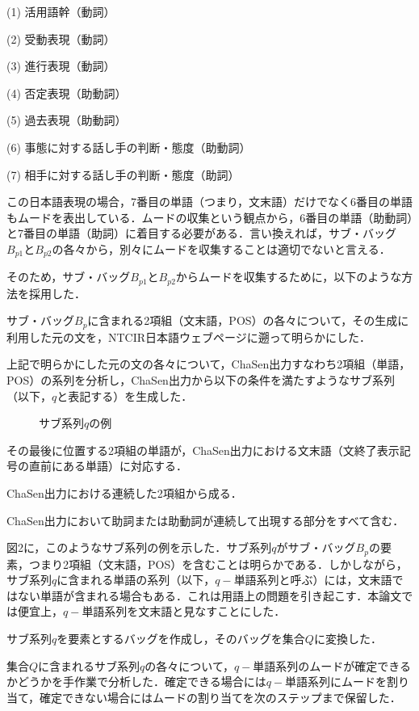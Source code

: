 \documentclass[japanese]{jnlp_1.4}
\newcommand{\InHone}[1]{}
\newcommand{\InHtwo}[1]{}
\begin{document}
(1) 活用語幹（動詞）

(2) 受動表現（動詞）

(3) 進行表現（動詞）

(4) 否定表現（助動詞）

(5) 過去表現（助動詞）

(6) 事態に対する話し手の判断・態度（助動詞）

(7) 相手に対する話し手の判断・態度（助詞）

この日本語表現の場合，7番目の単語（つまり，文末語）だけでなく6番目の単語もムードを表出している．ムードの収集という観点から，6番目の単語（助動詞）と7番目の単語（助詞）に着目する必要がある．言い換えれば，サブ・バッグ$B_{p1}$と$B_{p2}$の各々から，別々にムードを収集することは適切でないと言える．

そのため，サブ・バッグ$B_{p1}$と$B_{p2}$からムードを収集するために，以下のような方法を採用した．

\InHone{(1)} 
サブ・バッグ$B_{p}$に含まれる2項組（文末語，POS）の各々について，その生成に利用した元の文を，NTCIR日本語ウェブページに遡って明らかにした．

\InHone{(2)} 
上記で明らかにした元の文の各々について，ChaSen出力すなわち2項組（単語，POS）の系列を分析し，ChaSen出力から以下の条件を満たすようなサブ系列（以下，$q$と表記する）を生成した．

\begin{figure}[b]

 \caption{サブ系列$q$の例}
\end{figure}

\InHtwo{(a)}
その最後に位置する2項組の単語が，ChaSen出力における文末語（文終了表示記号の直前にある単語）に対応する．

\InHtwo{(b)}
ChaSen出力における連続した2項組から成る．

\InHtwo{(c)}
ChaSen出力において助詞または助動詞が連続して出現する部分をすべて含む．


図2に，このようなサブ系列の例を示した．サブ系列$q$がサブ・バッグ$B_{p}$の要素，つまり2項組（文末語，POS）を含むことは明らかである．しかしながら，サブ系列$q$に含まれる単語の系列（以下，$q-$単語系列と呼ぶ）には，文末語ではない単語が含まれる場合もある．これは用語上の問題を引き起こす．本論文では便宜上，$q-$単語系列を文末語と見なすことにした．

\InHone{(3)}
 サブ系列$q$を要素とするバッグを作成し，そのバッグを集合$Q$に変換した．

\InHone{(4)}
集合$Q$に含まれるサブ系列$q$の各々について，$q-$単語系列のムードが確定できるかどうかを手作業で分析した．確定できる場合には$q-$単語系列にムードを割り当て，確定できない場合にはムードの割り当てを次のステップまで保留した．
\end{document}
